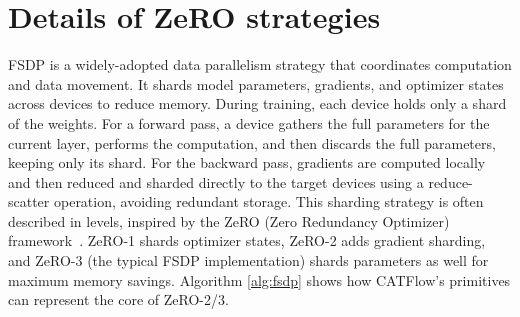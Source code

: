 \documentclass[letterpaper,twocolumn,10pt]{article}
\newcommand{\name}{CATFlow}
\begin{document}
\section{Details of ZeRO strategies}

FSDP is a widely-adopted data parallelism strategy that coordinates computation and data movement. It shards model parameters, gradients, and optimizer states across devices to reduce memory. During training, each device holds only a shard of the weights. For a forward pass, a device gathers the full parameters for the current layer, performs the computation, and then discards the full parameters, keeping only its shard. For the backward pass, gradients are computed locally and then reduced and sharded directly to the target devices using a reduce-scatter operation, avoiding redundant storage. This sharding strategy is often described in levels, inspired by the ZeRO (Zero Redundancy Optimizer) framework~\cite{rajbhandari2020zero}. ZeRO-1 shards optimizer states, ZeRO-2 adds gradient sharding, and ZeRO-3 (the typical FSDP implementation) shards parameters as well for maximum memory savings. Algorithm \ref{alg:fsdp} shows how \name{}'s primitives can represent the core of ZeRO-2/3. 
\end{document}
